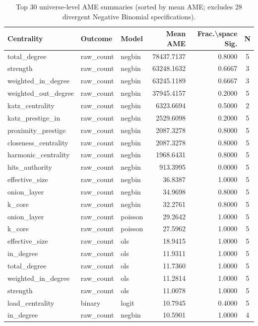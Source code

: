 \documentclass[11pt,a4paper]{article}
\begin{document}
\begin{table}[H]
\centering
\caption{Top 30 universe-level AME summaries (sorted by mean AME; excludes 28 divergent Negative Binomial specifications).}
\label{tab:ame_summary}
\begin{tabular}{lllrrc}
\toprule
Centrality & Outcome & Model & Mean AME & Frac.\textbackslash space Sig. & N \\
\midrule
total\_degree & raw\_count & negbin & 78437.7137 & 0.8000 & 5 \\
strength & raw\_count & negbin & 63248.1632 & 0.6667 & 3 \\
weighted\_in\_degree & raw\_count & negbin & 63245.1189 & 0.6667 & 3 \\
weighted\_out\_degree & raw\_count & negbin & 37945.4157 & 0.2000 & 5 \\
katz\_centrality & raw\_count & negbin & 6323.6694 & 0.5000 & 2 \\
katz\_prestige\_in & raw\_count & negbin & 2529.6098 & 0.2000 & 5 \\
proximity\_prestige & raw\_count & negbin & 2087.3278 & 0.8000 & 5 \\
closeness\_centrality & raw\_count & negbin & 2087.3278 & 0.8000 & 5 \\
harmonic\_centrality & raw\_count & negbin & 1968.6431 & 0.8000 & 5 \\
hits\_authority & raw\_count & negbin & 913.3995 & 0.0000 & 5 \\
effective\_size & raw\_count & negbin & 36.8387 & 1.0000 & 5 \\
onion\_layer & raw\_count & negbin & 34.9698 & 0.8000 & 5 \\
k\_core & raw\_count & negbin & 32.2761 & 0.8000 & 5 \\
onion\_layer & raw\_count & poisson & 29.2642 & 1.0000 & 5 \\
k\_core & raw\_count & poisson & 27.5962 & 1.0000 & 5 \\
effective\_size & raw\_count & ols & 18.9415 & 1.0000 & 5 \\
in\_degree & raw\_count & ols & 11.9311 & 1.0000 & 5 \\
total\_degree & raw\_count & ols & 11.7360 & 1.0000 & 5 \\
weighted\_in\_degree & raw\_count & ols & 11.2814 & 1.0000 & 5 \\
strength & raw\_count & ols & 11.0078 & 1.0000 & 5 \\
load\_centrality & binary & logit & 10.7945 & 0.4000 & 5 \\
in\_degree & raw\_count & negbin & 10.5901 & 1.0000 & 4 \\

\end{tabular}
\end{table}
\end{document}
